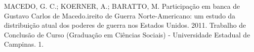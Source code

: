 

\begin{cvhonors}
  \cvhonor
    {MACEDO, G. C.; KOERNER, A.; BARATTO, M.}
    {Participação em banca de Gustavo Carlos de Macedo.ireito de Guerra Norte-Americano: um estudo da distribuição atual dos poderes de guerra nos Estados Unidos. 2011. Trabalho de Conclusão de Curso (Graduação em Ciências Sociais) - Universidade Estadual de Campinas.}
    {}
    {1. }
\end{cvhonors}
